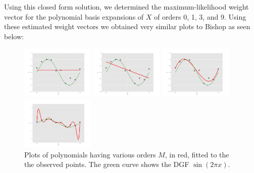 \documentclass[10pt]{article}
\begin{document}
Using this closed form solution, we determined the maximum-likelihood weight vector for the polynomial basis expansions of $X$ of orders 0, 1, 3, and 9. Using these estimated weight vectors we obtained very similar plots to Bishop as seen below:

\begin{figure}[ht]
	\centering
	\begin{minipage}[b]{.24\linewidth}
		\includegraphics[width=1\linewidth, height=1in]{Meq0.png}
		\caption*{$M=0$}
	\end{minipage}
	\begin{minipage}[b]{.24\linewidth}
		\includegraphics[width=1\linewidth, height=1in]{Meq1.png}
		\caption*{$M=1$}
	\end{minipage}
	\begin{minipage}[b]{.24\linewidth}
		\includegraphics[width=1\linewidth, height=1in]{Meq3.png}
		\caption*{$M=3$}
	\end{minipage}
	\begin{minipage}[b]{.24\linewidth}
		\includegraphics[width=1\linewidth, height=1in]{Meq9.png}
		\caption*{$M=9$}
	\end{minipage}
	\caption{Plots of polynomials having various orders $M$, in red, fitted to the the observed points. The green curve shows the DGF $\sin(2\pi x)$.}
\end{figure}
\end{document}
